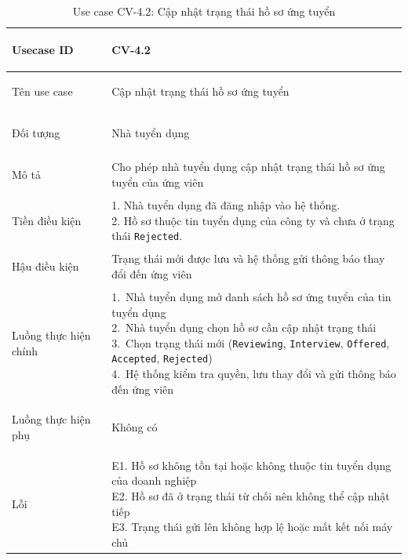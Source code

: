 \begin{table}[H]
    \centering
    \small
    \renewcommand{\arraystretch}{0.90}
    \begin{tabularx}{\textwidth}{|
        >{\bfseries\raggedright\arraybackslash}p{2.6cm}|Y|}
        \hline

        Usecase ID & CV-4.2 \\ \hline

        Tên use case & Cập nhật trạng thái hồ sơ ứng tuyển \\ \hline

        Đối tượng & Nhà tuyển dụng \\ \hline

        Mô tả & Cho phép nhà tuyển dụng cập nhật trạng thái hồ sơ ứng tuyển của ứng viên \\ \hline

        Tiền điều kiện &
        \parbox[t]{\hsize}{
            1. Nhà tuyển dụng đã đăng nhập vào hệ thống.\\
            2. Hồ sơ thuộc tin tuyển dụng của công ty và chưa ở trạng thái \texttt{Rejected}.
        } \\
        \hline

        Hậu điều kiện & Trạng thái mới được lưu và hệ thống gửi thông báo thay đổi đến ứng viên \\ \hline

        Luồng thực hiện chính &
        \parbox[t]{\hsize}{\raggedright
            1.\ Nhà tuyển dụng mở danh sách hồ sơ ứng tuyển của tin tuyển dụng\\
            2.\ Nhà tuyển dụng chọn hồ sơ cần cập nhật trạng thái\\
            3.\ Chọn trạng thái mới (\texttt{Reviewing}, \texttt{Interview}, \texttt{Offered}, \texttt{Accepted}, \texttt{Rejected})\\
            4.\ Hệ thống kiểm tra quyền, lưu thay đổi và gửi thông báo đến ứng viên
        }\\
        \hline

        Luồng thực hiện phụ & Không có \\
        \hline

        Lỗi &
        \parbox[t]{\hsize}{\raggedright
            E1. Hồ sơ không tồn tại hoặc không thuộc tin tuyển dụng của doanh nghiệp\\
            E2. Hồ sơ đã ở trạng thái từ chối nên không thể cập nhật tiếp\\
            E3. Trạng thái gửi lên không hợp lệ hoặc mất kết nối máy chủ
        }\\
        \hline
    \end{tabularx}

    \caption{Use case CV-4.2: Cập nhật trạng thái hồ sơ ứng tuyển}
    \label{tab:usecase-cv42}
\end{table}



